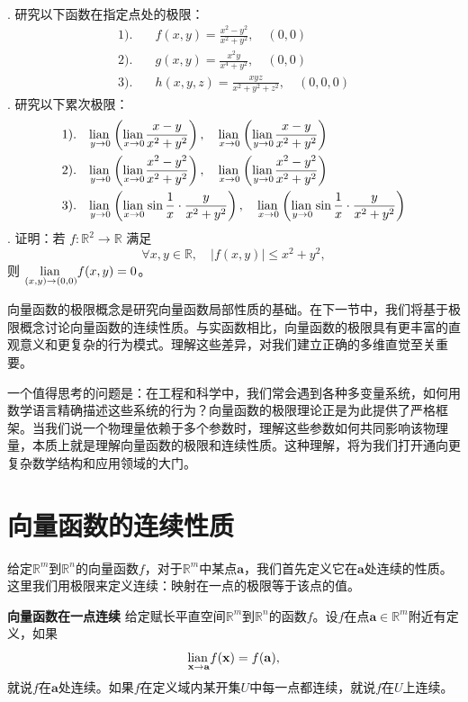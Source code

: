 \documentclass[12pt,UTF8]{ctexbook}
\begin{document}
\begin{xt}
\mbox{} \\
. 研究以下函数在指定点处的极限：
\begin{align*}
1).& \quad f(x, y) = \frac{x^2-y^2}{x^2+y^2}, \quad (0, 0) \\
2).& \quad g(x, y) = \frac{x^2y}{x^4+y^2}, \quad (0, 0) \\
3).& \quad h(x, y, z) = \frac{xyz}{x^2+y^2+z^2}, \quad (0, 0, 0)
\end{align*}
. 研究以下累次极限：
\begin{align*}
1).& \quad \underset{y\to 0}{\operatorname{lian}\,} \left(\underset{x\to 0}{\operatorname{lian}\,} \frac{x-y}{x^2+y^2}\right), \quad \underset{x\to 0}{\operatorname{lian}\,} \left(\underset{y\to 0}{\operatorname{lian}\,} \frac{x-y}{x^2+y^2}\right) \\
2).& \quad \underset{y\to 0}{\operatorname{lian}\,} \left(\underset{x\to 0}{\operatorname{lian}\,} \frac{x^2-y^2}{x^2+y^2}\right), \quad \underset{x\to 0}{\operatorname{lian}\,} \left(\underset{y\to 0}{\operatorname{lian}\,} \frac{x^2-y^2}{x^2+y^2}\right) \\
3).& \quad \underset{y\to 0}{\operatorname{lian}\,} \left(\underset{x\to 0}{\operatorname{lian}\,} \sin{\frac{1}{x}} \cdot \frac{y}{x^2+y^2}\right), \quad \underset{x\to 0}{\operatorname{lian}\,} \left(\underset{y\to 0}{\operatorname{lian}\,} \sin{\frac{1}{x}} \cdot \frac{y}{x^2+y^2}\right)
\end{align*}
. 证明：若 $f: \mathbb{R}^2 \to \mathbb{R}$ 满足
$$ \forall x, y \in \mathbb{R}, \quad |f(x, y)| \leq x^2 + y^2, $$
则 $\underset{(x,y)\to (0,0)}{\operatorname{lian}\,} f(x, y) = 0$。
\end{xt}

向量函数的极限概念是研究向量函数局部性质的基础。在下一节中，我们将基于极限概念讨论向量函数的连续性质。与实函数相比，向量函数的极限具有更丰富的直观意义和更复杂的行为模式。理解这些差异，对我们建立正确的多维直觉至关重要。

一个值得思考的问题是：在工程和科学中，我们常会遇到各种多变量系统，如何用数学语言精确描述这些系统的行为？向量函数的极限理论正是为此提供了严格框架。当我们说一个物理量依赖于多个参数时，理解这些参数如何共同影响该物理量，本质上就是理解向量函数的极限和连续性质。这种理解，将为我们打开通向更复杂数学结构和应用领域的大门。

\section{向量函数的连续性质}
给定$\mathbb{R}^m$到$\mathbb{R}^n$的向量函数$f$，对于$\mathbb{R}^m$中某点$\mathbf{a}$，我们首先定义它在$\mathbf{a}$处连续的性质。这里我们用极限来定义连续：映射在一点的极限等于该点的值。

\begin{df}{\textbf{向量函数在一点连续}}
给定赋长平直空间$\mathbb{R}^m$到$\mathbb{R}^n$的函数$f$。设$f$在点$\mathbf{a}\in\mathbb{R}^m$附近有定义，如果
$$ \underset{\mathbf{x}\to \mathbf{a}}{\operatorname{lian}\,} f(\mathbf{x}) = f(\mathbf{a}), $$
就说$f$在$\mathbf{a}$处连续。如果$f$在定义域内某开集$U$中每一点都连续，就说$f$在$U$上连续。
\end{df}
\end{document}
